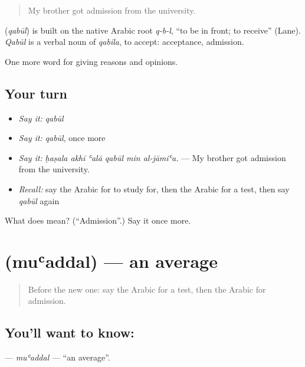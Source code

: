 \begin{quote}
My brother got admission from the university.
\end{quote}

\begin{cousinweb}
\textbf{} (\emph{qabūl}) is built on the native Arabic root \emph{q-b-l}, \textquotedblleft{}to be in front; to receive\textquotedblright{} (Lane). \emph{Qabūl} is a verbal noun of \emph{qabila}, to accept: acceptance, admission.
\end{cousinweb}

\begin{grammarlens}[title={What you've built}]
One more word for giving reasons and opinions.
\end{grammarlens}

\subsection*{Your turn}
\begin{itemize}
\raggedright
  \item \emph{Say it:} \emph{qabūl}
  \item \emph{Say it:} \emph{qabūl}, once more
  \item \emph{Say it:} \emph{ḥaṣala akhī ʿalā qabūl min al-jāmiʿa.} — My brother got admission from the university.
  \item \emph{Recall:} say the Arabic for to study for, then the Arabic for a test, then say \emph{qabūl} again
\end{itemize}

\begin{tcolorbox}[breakable,colback=teal!4,colframe=teal!35!black,title={Before you move on}]
What does  mean? (\textquotedblleft{}Admission\textquotedblright{}.) Say it once more.
\end{tcolorbox}
\section[\texorpdfstring{\ar{معدل} (muʿaddal)}{معدل (muʿaddal)}]{ (muʿaddal) — an average}

\label{lesson:AR-C393-muaddal}



\begin{quote}
Before the new one: say the Arabic for a test, then the Arabic for admission.
\end{quote}

\subsection*{You'll want to know: }
\textbf{} — \emph{muʿaddal} — \textquotedblleft{}an average\textquotedblright{}.

